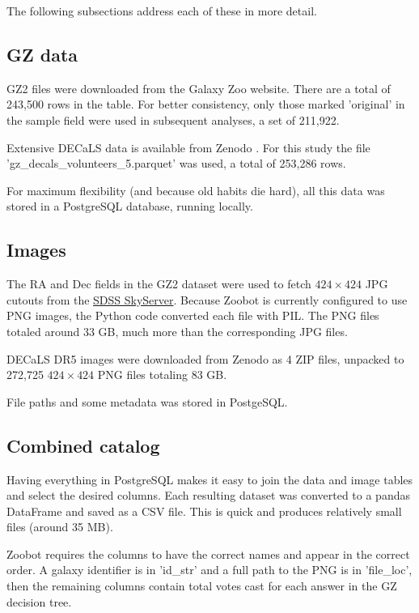 \documentclass[twocolumn, twocolappendix, tighten]{aastex631}
\begin{document}
The following subsections address each of these in more detail.

\subsection{GZ data}

GZ2 files were downloaded from the Galaxy Zoo website.
There are a total of 243,500 rows in the table. For better consistency, only those marked 'original' in the sample field were used in subsequent analyses, a set of 211,922.

Extensive DECaLS data is available from Zenodo \citep{walmsley_mike_2020_4573248}. For this study the file 'gz\_decals\_volunteers\_5.parquet' was used, a total of 253,286 rows.

For maximum flexibility (and because old habits die hard), all this data was stored in a PostgreSQL database, running locally.

\subsection{Images}

The RA and Dec fields in the GZ2 dataset were used to fetch $424 \times 424$ JPG cutouts from the \href{http://skyserver.sdss.org/dr14/SkyServerWS/ImgCutout/getjpeg}{SDSS SkyServer}. Because Zoobot is currently configured to use PNG images, the Python code converted each file with PIL. The PNG files totaled around 33 GB, much more than the corresponding JPG files.

DECaLS DR5 images were downloaded from Zenodo \citep{walmsley_mike_2020_4573248} as 4 ZIP files, unpacked to 272,725 $424 \times 424$ PNG files totaling 83 GB. 

File paths and some metadata was stored in PostgeSQL.

\subsection{Combined catalog}

Having everything in PostgreSQL makes it easy to join the data and image tables and select the desired columns. Each resulting dataset was converted to a pandas DataFrame and saved as a CSV file. This is quick and produces relatively small files (around 35 MB).

Zoobot requires the columns to have the correct names and appear in the correct order. A galaxy identifier is in 'id\_str' and a full path to the PNG is in 'file\_loc', then the remaining columns contain total votes cast for each answer in the GZ decision tree.
\end{document}
